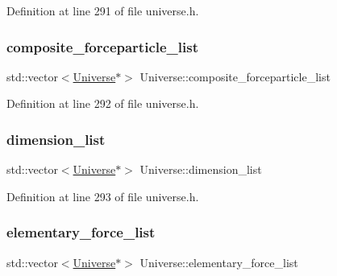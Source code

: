 Definition at line 291 of file universe.\+h.

\mbox{\label{class_universe_ae9795d06e406c4322637825aa545aa2f}} 
\subsubsection{\texorpdfstring{composite\+\_\+forceparticle\+\_\+list}{composite\_forceparticle\_list}}
{\footnotesize\ttfamily std\+::vector$<$\hyperlink{class_universe}{Universe}$\ast$$>$ Universe\+::composite\+\_\+forceparticle\+\_\+list\hspace{0.3cm}{\ttfamily [protected]}}



Definition at line 292 of file universe.\+h.

\mbox{\label{class_universe_a159461f7098c3a30274f54c8acff6eac}} 
\subsubsection{\texorpdfstring{dimension\+\_\+list}{dimension\_list}}
{\footnotesize\ttfamily std\+::vector$<$\hyperlink{class_universe}{Universe}$\ast$$>$ Universe\+::dimension\+\_\+list\hspace{0.3cm}{\ttfamily [protected]}}



Definition at line 293 of file universe.\+h.

\mbox{\label{class_universe_a015b19f6d5ad84ebaa9e3e7c8352389c}} 
\subsubsection{\texorpdfstring{elementary\+\_\+force\+\_\+list}{elementary\_force\_list}}
{\footnotesize\ttfamily std\+::vector$<$\hyperlink{class_universe}{Universe}$\ast$$>$ Universe\+::elementary\+\_\+force\+\_\+list\hspace{0.3cm}{\ttfamily [protected]}}



